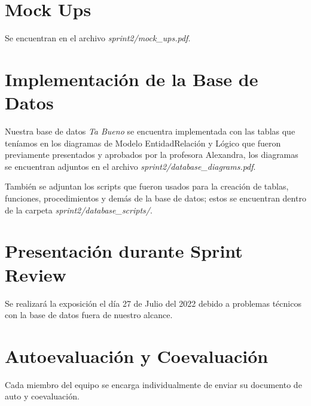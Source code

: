 \documentclass{article}
\begin{document}
\section{Mock Ups}
Se encuentran en el archivo \textit{sprint2/mock\_ups.pdf}.

 \section{Implementación de la Base de Datos}
Nuestra base de datos \textit{Ta Bueno} se encuentra implementada con las tablas que teníamos
en los diagramas de Modelo Entidad\-Relación y Lógico que fueron previamente presentados y aprobados por la profesora 
Alexandra, los diagramas se encuentran adjuntos en el archivo \textit{sprint2/database\_diagrams.pdf}.

También se adjuntan los scripts que fueron usados para la creación de tablas, funciones, procedimientos 
y demás de la base de datos; estos se encuentran dentro de la carpeta \textit{sprint2/database\_scripts/}.

\section{Presentación durante Sprint Review}
Se realizará la exposición el día 27 de Julio del 2022 debido a problemas técnicos con la 
base de datos fuera de nuestro alcance.

\section{Autoevaluación y Coevaluación}
Cada miembro del equipo se encarga individualmente de enviar su documento de auto y coevaluación.


\newpage


\end{document}
